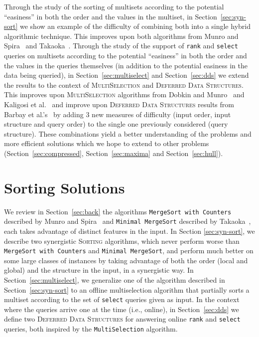 Through the study of the sorting of multisets according to the
potential ``easiness'' in both the order and the values in the
multiset, in Section~\ref{sec:syn-sort} we show an example of the
difficulty of combining both into a single hybrid algorithmic
technique. This improves upon both algorithms from Munro and
Spira~\cite{1976-JComp-SortingAndSearchingInMultisets-MunroSpira} and
Takaoka~\cite{2009-Chapter-PartialSolutionAndEntropy-Takaoka}.
%
Through the study of the support of \texttt{rank} and \texttt{select}
queries on multisets according to the potential ``easiness'' in both
the order and the values in the queries themselves (in addition to the
potential easiness in the data being queried), in
Section~\ref{sec:multiselect} and Section~\ref{sec:dds} we extend the
results to the context of \textsc{MultiSelection} and \textsc{Deferred
  Data Structures}. This improves upon \textsc{MultiSelection}
algorithms from Dobkin and
Munro~\cite{1981-JACM-OptimalTimeMinimalSpaceSelectionAlgorithms-DobkinMunro}
and Kaligosi et
al.~\cite{2005-ICALP-TowardsOptimalMultopleSelection-KaligosiMehlhornMunroSanders}
and improve upon \textsc{Deferred Data
  Structures} results from Barbay et al.'s~\cite{2016-JDA-NearOptimalOnlineMultiselectionInInternalAndExternalMemory-BarbayGuptaRaoSorenson}
by adding 3 new measures of difficulty (input order, input structure
and query order) to the single one previously considered (query
structure).
These combinations yield a better
understanding of the problems and more efficient solutions which we
hope to extend to other problems (Section~\ref{sec:compressed},
Section~\ref{sec:maxima} and Section~\ref{sec:hull}).

\section{Sorting Solutions}
\label{sec:sort}

We review in Section~\ref{sec:back} the algorithms \texttt{MergeSort
  with Counters} described by Munro and
Spira~\cite{1976-JComp-SortingAndSearchingInMultisets-MunroSpira} and
\texttt{Minimal MergeSort} described by
Takaoka~\cite{2009-Chapter-PartialSolutionAndEntropy-Takaoka}, each
takes advantage of distinct features in the input. In Section
\ref{sec:syn-sort}, we describe two synergistic \textsc{Sorting}
algorithms, which never perform worse than \texttt{MergeSort with
  Counters} and \texttt{Minimal MergeSort}, and perform much better on
some large classes of instances by taking advantage of both the order
(local and global) and the structure in the input, in a synergistic
way. In Section~\ref{sec:multiselect}, we generalize one of the
algorithm described in Section~\ref{sec:syn-sort} to an offline
multiselection algorithm that partially sorts a multiset according to
the set of \texttt{select} queries given as input. In the context
where the queries arrive one at the time (i.e., online), in
Section~\ref{sec:dds} we define two \textsc{Deferred Data Structures}
for answering online \texttt{rank} and \texttt{select} queries, both
inspired by the \texttt{MultiSelection} algorithm.

